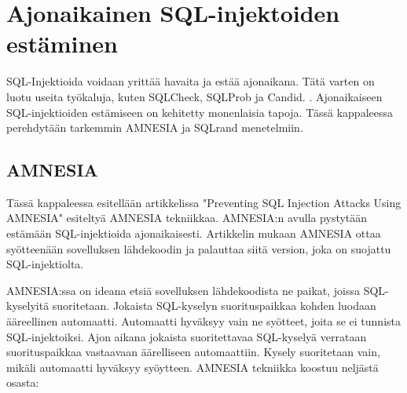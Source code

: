 \documentclass[finnish]{tktltiki2}
\theoremstyle{definition}
\theoremstyle{remark}
\begin{document}
	\section{Ajonaikainen SQL-injektoiden estäminen}
	SQL-Injektioida voidaan yrittää havaita ja estää ajonaikana. Tätä varten on luotu useita työkaluja, kuten SQLCheck, SQLProb ja Candid. \cite{preventions}. Ajonaikaiseen SQL-injektioiden estämiseen on kehitetty monenlaisia tapoja. Tässä kappaleessa perehdytään tarkemmin AMNESIA ja SQLrand menetelmiin.
	
	\subsection{AMNESIA}
	Tässä kappaleessa esitellään artikkelissa "Preventing SQL Injection Attacks Using AMNESIA"\space\cite{amnesia} esiteltyä AMNESIA tekniikkaa. AMNESIA:n avulla pystytään estämään SQL-injektioida ajonaikaisesti. Artikkelin mukaan AMNESIA ottaa syötteenään sovelluksen lähdekoodin ja palauttaa siitä version, joka on suojattu SQL-injektiolta.
	
	 AMNESIA:ssa on ideana etsiä sovelluksen lähdekoodista ne paikat, joissa SQL-kyselyitä suoritetaan. Jokaista SQL-kyselyn suorituspaikkaa kohden luodaan ääreellinen automaatti. Automaatti hyväksyy vain ne syötteet, joita se ei tunnista SQL-injektoiksi. Ajon aikana jokaista suoritettavaa SQL-kyselyä verrataan suorituspaikkaa vastaavaan äärelliseen automaattiin. Kysely suoritetaan vain, mikäli automaatti hyväksyy syöytteen. AMNESIA tekniikka koostuu neljästä osasta:
\end{document}
